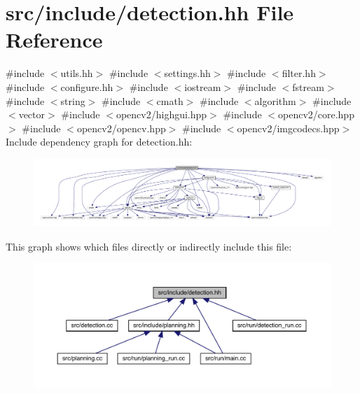 \hypertarget{detection_8hh}{}\section{src/include/detection.hh File Reference}
\label{detection_8hh}
{\ttfamily \#include $<$utils.\+hh$>$}\newline
{\ttfamily \#include $<$settings.\+hh$>$}\newline
{\ttfamily \#include $<$filter.\+hh$>$}\newline
{\ttfamily \#include $<$configure.\+hh$>$}\newline
{\ttfamily \#include $<$iostream$>$}\newline
{\ttfamily \#include $<$fstream$>$}\newline
{\ttfamily \#include $<$string$>$}\newline
{\ttfamily \#include $<$cmath$>$}\newline
{\ttfamily \#include $<$algorithm$>$}\newline
{\ttfamily \#include $<$vector$>$}\newline
{\ttfamily \#include $<$opencv2/highgui.\+hpp$>$}\newline
{\ttfamily \#include $<$opencv2/core.\+hpp$>$}\newline
{\ttfamily \#include $<$opencv2/opencv.\+hpp$>$}\newline
{\ttfamily \#include $<$opencv2/imgcodecs.\+hpp$>$}\newline
Include dependency graph for detection.\+hh\+:
\nopagebreak
\begin{figure}[H]
\begin{center}
\leavevmode
\includegraphics[width=350pt]{detection_8hh__incl}
\end{center}
\end{figure}
This graph shows which files directly or indirectly include this file\+:
\nopagebreak
\begin{figure}[H]
\begin{center}
\leavevmode
\includegraphics[width=350pt]{detection_8hh__dep__incl}
\end{center}
\end{figure}
